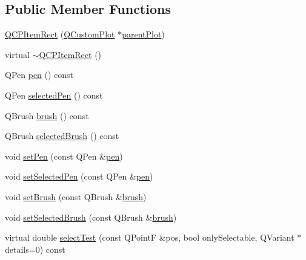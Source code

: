 \subsection*{Public Member Functions}
\begin{DoxyCompactItemize}
\item 
\hyperlink{classQCPItemRect_a412ad1579f7a1fba453d0fa28c496cbc}{Q\+C\+P\+Item\+Rect} (\hyperlink{classQCustomPlot}{Q\+Custom\+Plot} $\ast$\hyperlink{classQCPLayerable_ab7e0e94461566093d36ffc0f5312b109}{parent\+Plot})
\item 
virtual \hyperlink{classQCPItemRect_af9e89f80457afc2d0fd2c6527b40a5f2}{$\sim$\+Q\+C\+P\+Item\+Rect} ()
\item 
Q\+Pen \hyperlink{classQCPItemRect_a3cb7b6de5e82cc5a3c99e9de919a55e6}{pen} () const 
\item 
Q\+Pen \hyperlink{classQCPItemRect_a7e701c34e72a4c25647e93fa369f395c}{selected\+Pen} () const 
\item 
Q\+Brush \hyperlink{classQCPItemRect_a03d2d26ffcac78b25b8e90915f9c4abe}{brush} () const 
\item 
Q\+Brush \hyperlink{classQCPItemRect_a3b586228393f5c8efa78c4d2a4b25cbf}{selected\+Brush} () const 
\item 
void \hyperlink{classQCPItemRect_a483c0da5a17e1646cd17ddea2c124e7d}{set\+Pen} (const Q\+Pen \&\hyperlink{classQCPItemRect_a3cb7b6de5e82cc5a3c99e9de919a55e6}{pen})
\item 
void \hyperlink{classQCPItemRect_a52a1bcb2dc753a538e406a2ba3cf21ce}{set\+Selected\+Pen} (const Q\+Pen \&\hyperlink{classQCPItemRect_a3cb7b6de5e82cc5a3c99e9de919a55e6}{pen})
\item 
void \hyperlink{classQCPItemRect_abbd4e346a03513ee466afc25d9c75446}{set\+Brush} (const Q\+Brush \&\hyperlink{classQCPItemRect_a03d2d26ffcac78b25b8e90915f9c4abe}{brush})
\item 
void \hyperlink{classQCPItemRect_abd1792859844118dedee86223cede7af}{set\+Selected\+Brush} (const Q\+Brush \&\hyperlink{classQCPItemRect_a03d2d26ffcac78b25b8e90915f9c4abe}{brush})
\item 
virtual double \hyperlink{classQCPItemRect_af13b0797079b40b73d1c7286b76f18ac}{select\+Test} (const Q\+PointF \&pos, bool only\+Selectable, Q\+Variant $\ast$details=0) const 
\end{DoxyCompactItemize}

